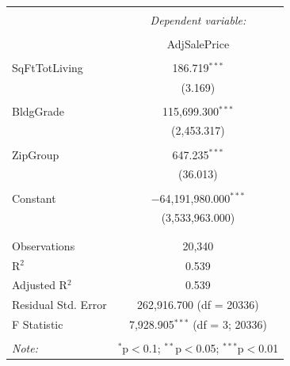 \documentclass[12pt,letterpaper]{article}
\begin{document}
 \vspace{.25cm}

\begin{table}[!htbp] \centering   \caption{}   \label{} \begin{tabular}{@{\extracolsep{5pt}}lc} \\[-1.8ex]\hline \hline \\[-1.8ex]  & \multicolumn{1}{c}{\textit{Dependent variable:}} \\ \cline{2-2} \\[-1.8ex] & AdjSalePrice \\ \hline \\[-1.8ex]  SqFtTotLiving & 186.719$^{***}$ \\   & (3.169) \\   & \\  BldgGrade & 115,699.300$^{***}$ \\   & (2,453.317) \\   & \\  ZipGroup & 647.235$^{***}$ \\   & (36.013) \\   & \\  Constant & $-$64,191,980.000$^{***}$ \\   & (3,533,963.000) \\   & \\ \hline \\[-1.8ex] Observations & 20,340 \\ R$^{2}$ & 0.539 \\ Adjusted R$^{2}$ & 0.539 \\ Residual Std. Error & 262,916.700 (df = 20336) \\ F Statistic & 7,928.905$^{***}$ (df = 3; 20336) \\ \hline \hline \\[-1.8ex] \textit{Note:}  & \multicolumn{1}{r}{$^{*}$p$<$0.1; $^{**}$p$<$0.05; $^{***}$p$<$0.01} \\ 
\end{tabular} 
\end{table} 
\end{document}
